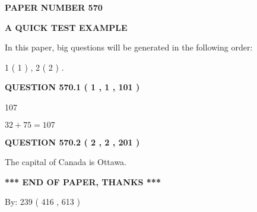 \documentclass[12pt]{article}
\begin{document}
   
 {\textbf{ \Large{ PAPER NUMBER  570  }}}
   
   
\vspace{0.2in}
   
   
   
   
   
   
 \vspace{0.2in}
{\LARGE {\textbf{ A QUICK TEST EXAMPLE}}}
   
   
   
\vspace{0.2in}
   
In this paper, big questions will be generated in the following order: 
   
   
   1 ( 1 )
 ,
   2 ( 2 )
 .
  
\vspace{0.2in}
  
{\textbf{\Large{QUESTION
570.1 
 ( 1 , 1 , 101 )
}}}
  
  
 
 
\noindent{}

107
 
 
 
 
\noindent{}

$ %
32 +  %
75=   %
107$
 
 
  
\vspace{0.2in}
  
{\textbf{\Large{QUESTION
570.2 
 ( 2 , 2 , 201 )
}}}
  
  
 
 
\noindent{}
 
 
The capital of Canada is Ottawa.
 
 
 
 
   
   
 \vspace{0.2in}
 
   
   
   
   
\vspace{1.0in} 
{\textbf{\large{ *** END OF PAPER, THANKS *** }}} 
   
   
\hspace{1.0in} By: 
 239 ( 416 ,  613 )
   
\end{document}
